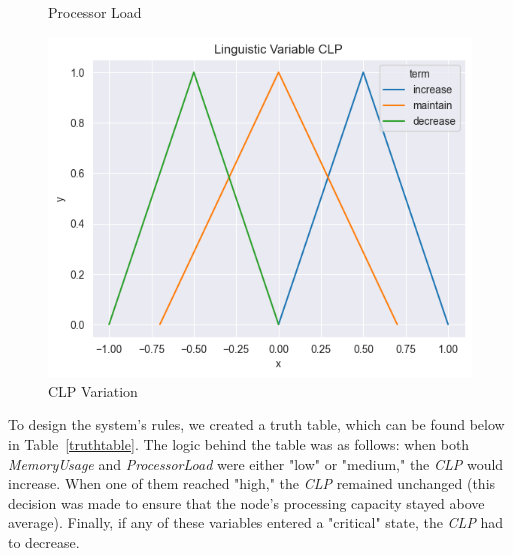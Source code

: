 \documentclass[11pt]{report}
\begin{document}
\begin{figure}[htbp]
\begin{minipage}{0.32\textwidth}
        \caption{Processor Load}
        \label{fig:memory_usage}
    \end{minipage}
    \hfill
    \begin{minipage}{0.32\textwidth}
        \centering
        \includegraphics[width=\textwidth]{../images/triangular_CLP}
        \caption{CLP Variation}
        \label{fig:clp}
    \end{minipage}
\end{figure}


To design the system's rules, we created a truth table, which can be found below in Table~\ref{truthtable}.
The logic behind the table was as follows: when both \textit{MemoryUsage} and \textit{ProcessorLoad} were either "low" or "medium," the \textit{CLP} would increase.
When one of them reached "high," the \textit{CLP} remained unchanged (this decision was made to ensure that the node's processing capacity stayed above average).
Finally, if any of these variables entered a "critical" state, the \textit{CLP} had to decrease.
\end{document}
